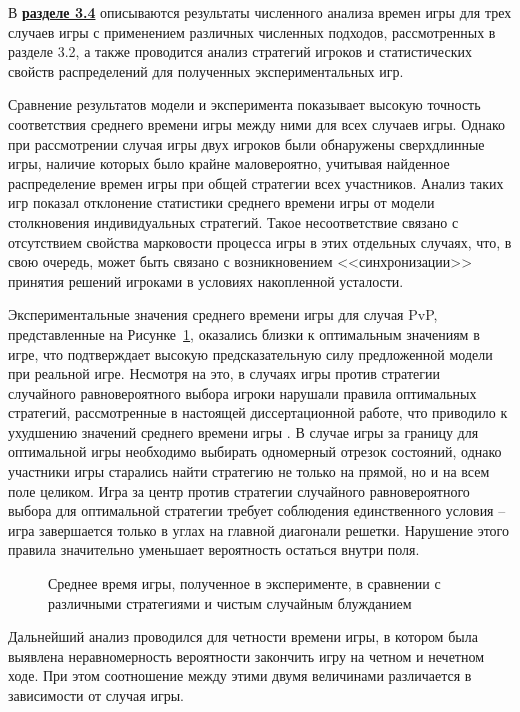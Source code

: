 В \underline{\textbf{разделе 3.4}} описываются результаты численного анализа времен игры для трех случаев игры с применением различных численных подходов, рассмотренных в разделе 3.2, а также проводится анализ стратегий игроков и статистических свойств распределений для полученных экспериментальных игр. 

Сравнение результатов модели и эксперимента показывает высокую точность соответствия среднего времени игры между ними для всех случаев игры. Однако при рассмотрении случая игры двух игроков были обнаружены сверхдлинные игры, наличие которых было крайне маловероятно, учитывая найденное распределение времен игры при общей стратегии всех участников. Анализ таких игр показал отклонение статистики среднего времени игры от модели столкновения индивидуальных стратегий. Такое несоответствие связано с отсутствием свойства марковости процесса игры в этих отдельных случаях, что, в свою очередь, может быть связано с возникновением <<синхронизации>> принятия решений игроками в условиях накопленной усталости.

Экспериментальные значения среднего времени игры для случая PvP, представленные на Рисунке~\cref{fig:mean-times}, оказались близки к оптимальным значениям в игре, что подтверждает высокую предсказательную силу предложенной модели при реальной игре. Несмотря на это, в случаях игры против стратегии случайного равновероятного выбора игроки нарушали правила оптимальных стратегий, рассмотренные в настоящей диссертационной работе, что приводило к ухудшению значений среднего времени игры \cite{confbib4}. В случае игры за границу для оптимальной игры необходимо выбирать одномерный отрезок состояний, однако участники игры старались найти стратегию не только на прямой, но и на всем поле целиком. Игра за центр против стратегии случайного равновероятного выбора для оптимальной стратегии требует соблюдения единственного условия -- игра завершается только в углах на главной диагонали решетки. Нарушение этого правила значительно уменьшает вероятность остаться внутри поля. 

\begin{figure}[ht]
    \caption{
        Среднее время игры, полученное в эксперименте, в сравнении с различными стратегиями и чистым случайным блужданием
    }  
    \label{fig:mean-times}
\end{figure}

Дальнейший анализ проводился для четности времени игры, в котором была выявлена неравномерность вероятности закончить игру на четном и нечетном ходе. При этом соотношение между этими двумя величинами различается в зависимости от случая игры. 

